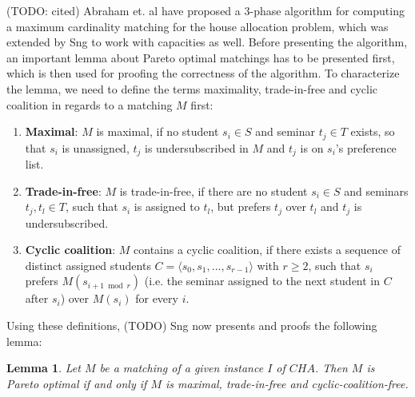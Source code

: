 (TODO: cited) Abraham et. al \cite{Abraham:Pacha} have proposed a 3-phase algorithm for computing a maximum cardinality matching for the house allocation problem, which was extended by Sng \cite{SngThesis} to work with capacities as well. Before presenting the algorithm, an important lemma about Pareto optimal matchings has to be presented first, which is then used for proofing the correctness of the algorithm. To characterize the lemma, we need to define the terms maximality, trade-in-free and cyclic coalition in regards to a matching $M$ first: 
\begin{enumerate}
    \item \textbf{Maximal}: $M$ is maximal, if no student $s_i \in S$ and seminar $t_j \in T$ exists, so that $s_i$ is unassigned, $t_j$ is undersubscribed in $M$ and $t_j$ is on $s_i$'s preference list.\cite{Abraham:Pacha}
    \item \textbf{Trade-in-free}: $M$ is trade-in-free, if there are no student $s_i \in S$ and seminars $t_j, t_l \in T$, such that $s_i$ is assigned to $t_l$, but prefers $t_j$ over $t_l$ and $t_j$ is undersubscribed.\cite{Abraham:Pacha} 
    \item \textbf{Cyclic coalition}: $M$ contains a cyclic coalition, if there exists a sequence of distinct assigned students $C = \langle s_0, s_1, \dots, s_{r-1} \rangle$ with $r \geq 2$, such that $s_i$ prefers $M(s_{i + 1 \bmod r})$ (i.e. the seminar assigned to the next student in $C$ after $s_i$) over $M(s_i)$ for every $i$.\cite{Abraham:Pacha}
\end{enumerate}
Using these definitions, (TODO) Sng now presents and proofs the following lemma:
\newtheorem{lemma}[theorem]{Lemma}
\begin{lemma}\label{lemma-pacha}
    Let $M$ be a matching of a given instance $I$ of $CHA$. Then $M$ is Pareto optimal if and only if $M$ is maximal, trade-in-free and cyclic-coalition-free.\cite{Abraham:Pacha}
\end{lemma}

